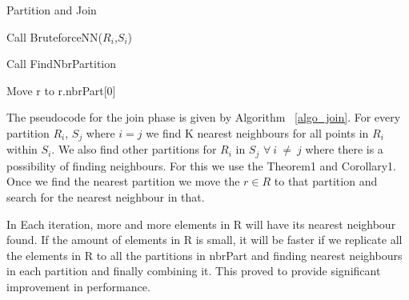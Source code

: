 \begin{algorithm}
  \caption{Partition and Join}
  \label{algo_join}
  \begin{algorithmic}[1]
    \REPEAT

    \STATE Call BruteforceNN($R_i$,$S_i$)
    \ENDFOR

    \STATE Call FindNbrPartition

    \STATE Move r to r.nbrPart[0]
    \ENDFOR


  \end{algorithmic}
\end{algorithm}


\bigskip

The pseudocode for the join phase is given by Algorithm ~\ref{algo_join}.
For every partition $R_i$,
$S_j$ where $i=j$ we find K nearest neighbours for all points in
$R_i$ within $S_i$. We also find other partitions for $R_i$ in $S_j$
$\forall\ i\ \neq\ j$ where there is a possibility of finding
neighbours. For this we use the Theorem1 and Corollary1.
Once we find the nearest partition we move the $r \in R$ to that partition
and search for the nearest neighbour in that.

In Each iteration, more and more elements in R will have its nearest
neighbour found. If the amount of elements in R is small, it will be
faster if we replicate all the elements in R to all the partitions in nbrPart
and finding nearest neighbours in each partition and finally combining
it. This proved to provide significant improvement in performance.

\bigskip

